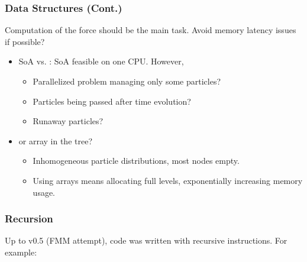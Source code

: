 \begin{frame}
	\frametitle{Data Structures (Cont.)}
	Computation of the force should be the main task. Avoid memory latency issues if possible?
	\begin{itemize}
		\item<1-> SoA vs. : SoA feasible on one CPU. However,
		\begin{itemize}
			\item Parallelized problem managing only some particles?
			\item Particles being passed after time evolution?
			\item Runaway particles?
		\end{itemize}
		\item<2->  or array in the tree?
		\begin{itemize}
			\item Inhomogeneous particle distributions, most nodes empty.
			\item Using arrays means allocating full levels, exponentially increasing memory usage.
		\end{itemize}
	\end{itemize}

\end{frame}

\begin{frame}
\frametitle{Recursion}
Up to v0.5 (FMM attempt), code was written with recursive instructions. For example:

\end{frame}
